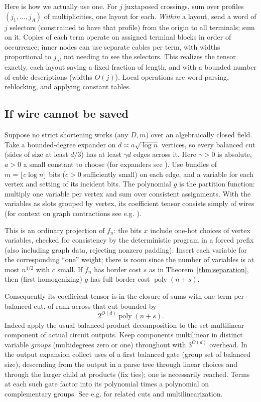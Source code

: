 \documentclass[11pt,letterpaper]{article}
\theoremstyle{definition}
\numberwithin{equation}{section}
\DeclareMathOperator{\poly}{poly}
\begin{document}
Here is how we actually use one. For $j$ juxtaposed crossings, sum over profiles $(j_1,\ldots,j_A)$
of multiplicities, one layout for each. \emph{Within} a layout, send a word of $j$ selectors (constrained
to have that profile) from the origin to all terminals; sum on it. Copies of each term operate
on assigned terminal blocks in order of occurrence; inner nodes can use separate cables per
term, with widths proportional to $j_a$, not needing to see the selectors. This realizes the
tensor exactly, each layout saving a fixed fraction of length, and with a bounded number
of cable descriptions (widths $O(j)$). Local operations are word parsing, reblocking, and
applying constant tables.

\subsection{If wire cannot be saved}

Suppose no strict shortening works (any $D,m$) over an algebraically closed field. Take a
bounded-degree expander on $d\asymp a\sqrt{\log n}$ vertices, so every balanced cut (sides of size at
least $d/3$) has at least $\gamma d$ edges across it. Here $\gamma >0$ is absolute, $a>0$ a small constant to
choose (for expanders see \cite{HLW}). Use bundles of $m=\lfloor c\log n\rfloor$ bits ($c>0$ sufficiently small) on
each edge, and a variable for each vertex and setting of its incident bits. The polynomial $g$ is
the partition function: multiply one variable per vertex and sum over consistent assignments.
With the variables as slots grouped by vertex, its coefficient tensor consists simply of wires
(for context on graph contractions see e.g. \cite{MarkovShi}).

This is an ordinary projection of $f_n$: the bits $x$ include one-hot choices of vertex variables,
checked for consistency by the deterministic program in a forced prefix (also including graph
data, rejecting nonzero padding). Insert each variable for the corresponding ``one'' weight;
there is room since the number of variables is at most $n^{1/2}$ with $c$ small. If $f_n$ has border
cost $s$ as in Theorem~\ref{thm:separation}, then (first homogenizing) $g$ has full border cost $\poly(n+s)$.

Consequently its coefficient tensor is in the closure of sums with one term per balanced
cut, of rank across that cut bounded by
\[
  2^{O(d)}\poly(n+s).
\]
Indeed apply the usual balanced-product decomposition to the set-multilinear component of
actual circuit outputs. Keep components multilinear in distinct variable \emph{groups} (multidegrees
zero or one) throughout with $3^{O(d)}$ overhead. In the output expansion collect uses of a first
balanced gate (group set of balanced size), descending from the output in a parse tree through
linear choices and through the larger child at products (fix ties); one is necessarily reached.
Terms at each such gate factor into its polynomial times a polynomial on complementary
groups. See e.g. \cite{ValiantProjections,VSBR,Raz13rank} for related cuts and multilinearization.
\end{document}
